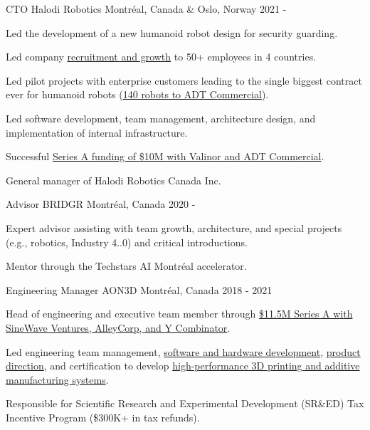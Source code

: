 \begin{cventries}

    \cventry
    {CTO}
    {Halodi Robotics}
    {Montréal, Canada \& Oslo, Norway}
    {2021 - }
    {
        \begin{cvitems}
            \item{Led the development of a new humanoid robot design for security guarding.}
            \item{Led company \href{https://www.nicholasnadeau.com/talk/society-robots-and-us-hiring-for-inclusive-robotics/}{recruitment and growth} to 50+ employees in 4 countries.}
            \item{Led pilot projects with enterprise customers leading to the single biggest contract ever for humanoid robots (\href{https://www.halodi.com/press-releases/halodi-robotics-inks-contract-with-adt-commercial-for-delivery-of-140-humanoid-robots}{140 robots to ADT Commercial}).}
            \item{Led software development, team management, architecture design, and implementation of internal infrastructure.}
            \item{Successful \href{https://www.halodi.com/press-releases/adt-invests-in-and-partners-with-halodi-robotics-lbz49}{Series A funding of \$10M with Valinor and ADT Commercial}.}
            \item{General manager of Halodi Robotics Canada Inc.}
        \end{cvitems}
    }

    \cventry
    {Advisor}
    {BRIDGR}
    {Montréal, Canada}
    {2020 - }
    {
        \begin{cvitems}
            \item{Expert advisor assisting with team growth, architecture, and special projects (e.g., robotics, Industry 4..0) and critical introductions.}
            \item{Mentor through the Techstars AI Montréal accelerator.}
        \end{cvitems}
    }

    \cventry
    {Engineering Manager}
    {AON3D}
    {Montréal, Canada}
    {2018 - 2021}
    {
        \begin{cvitems}
            \item{Head of engineering and executive team member through \href{https://techcrunch.com/2021/09/02/3d-printing-startup-aon3d-closes-11-5m-series-a/}{\$11.5M Series A with SineWave Ventures, AlleyCorp, and Y Combinator}.}
            \item{Led engineering team management, \href{https://www.nicholasnadeau.com/talk/making-materials-matter/}{software and hardware development}, \href{https://www.nicholasnadeau.com/talk/the-products-by-design-podcast/}{product direction}, and certification to develop \href{https://www.aon3d.com/}{high-performance 3D printing and additive manufacturing systems}.}
            \item{Responsible for Scientific Research and Experimental Development (SR\&ED) Tax Incentive Program (\$300K+ in tax refunds).}
        \end{cvitems}
    }


\end{cventries}
